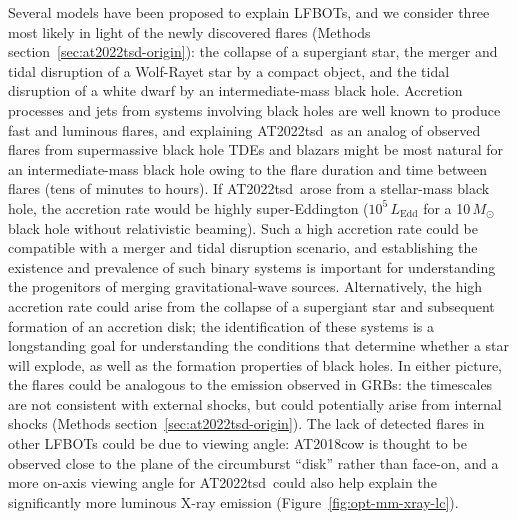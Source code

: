 \documentclass{nature_plusfigure}
\newcommand{\at}{AT2022tsd}
\begin{document}
Several models have been proposed to explain LFBOTs\cite{Metzger2022}, and we consider three most likely in light of the newly discovered flares (Methods section~\ref{sec:at2022tsd-origin}): the collapse of a supergiant star\cite{Perley2019,Margutti2019,Quataert2019}, the merger and tidal disruption of a Wolf-Rayet star by a compact object\cite{Metzger2022}, and the tidal disruption of a white dwarf by an intermediate-mass black hole\cite{Kuin2019,Perley2019}.
Accretion processes and jets from systems involving black holes are well known to produce fast and luminous flares,
and explaining \at\ as an analog of observed flares from supermassive black hole TDEs and blazars might be most natural for an intermediate-mass black hole owing to the flare duration and time between flares (tens of minutes to hours).
If \at\ arose from a stellar-mass black hole, the accretion rate would be highly super-Eddington ($10^{5}\,L_\mathrm{Edd}$ for a 10\,$M_\odot$ black hole without relativistic beaming). Such a high accretion rate could be compatible with a merger and tidal disruption scenario\cite{Metzger2022}, and establishing the existence and prevalence of such binary systems is important for understanding the progenitors of merging gravitational-wave sources.
Alternatively, the high accretion rate could arise from the collapse of a supergiant star\cite{Quataert2019} and subsequent formation of an accretion disk; the identification of these systems is a longstanding goal for understanding the conditions that determine whether a star will explode, as well as the formation properties of black holes.
In either picture, the flares could be analogous to the emission observed in GRBs: the timescales are not consistent with external shocks, but could potentially arise from internal shocks (Methods section~\ref{sec:at2022tsd-origin}).
The lack of detected flares in other LFBOTs could be due to viewing angle: AT2018cow is thought to be observed close to the plane of the circumburst ``disk'' rather than face-on\cite{Margutti2019,Chen2023}, and a more on-axis viewing angle for \at\ could also help explain the significantly more luminous X-ray emission (Figure~\ref{fig:opt-mm-xray-lc}).
\end{document}
